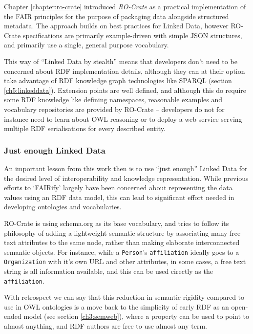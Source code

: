 Chapter \vref{chapter:ro-crate} introduced \emph{RO-Crate} as a practical implementation of the FAIR principles for the purpose of packaging data alongside structured metadata. The approach builds on best practices for Linked Data, however RO-Crate specifications are primarily example-driven with simple JSON structures, and primarily use a single, general purpose vocabulary. 

This way of ``Linked Data by stealth'' means that developers don't need to be concerned about RDF implementation details, although they can at their option take advantage of RDF knowledge graph technologies like SPARQL (section \vref{ch5:linkeddata}). Extension points are well defined, and although this do require some RDF knowledge like defining namespaces, reasonable examples and vocabulary repositories are provided by RO-Crate --  developers do not for instance need to learn about OWL reasoning or to deploy a web service serving multiple RDF serialisations for every described entity.



\subsubsection{Just enough Linked Data}

An important lesson from this work then is to use ``just enough'' Linked Data for the desired level of interoperability and knowledge representation. While previous efforts to `FAIRify' largely have been concerned about representing the data values using an RDF data model, this can lead to significant effort needed in developing ontologies and vocabularies. 

RO-Crate is using schema.org \cite{schema.org} as its base vocabulary, and tries to follow its philosophy of adding a lightweight semantic structure by associating many free text attributes to the same node, rather than making elaborate interconnected semantic objects. For instance, while a \texttt{Person}'s \texttt{affiliation} ideally goes to a \texttt{Organization} with it's own URL and other attributes, in some cases, a free text string is all information available, and this can be used cirectly as the \texttt{affiliation}. 

With retrospect we can say that this reduction in semantic rigidity compared to use in OWL ontologies is a move back to the simplicity of early RDF as an open-ended model (see section \vref{ch3:semweb}), where a property can be used to point to almost anything, and RDF authors are free to use almost any term.

